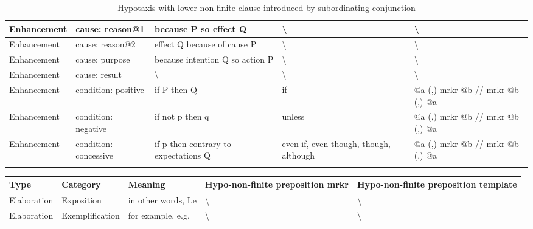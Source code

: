 \begin{landscape}
\begin{longtable}{|l|l|p{3cm}|p{5cm}|p{5cm}|}
			Enhancement & cause: reason@1        & because P so effect Q                & \textbackslash                         & \textbackslash                             \\ \hline
			Enhancement & cause: reason@2        & effect Q because of cause P          & \textbackslash                         & \textbackslash                             \\ \hline
			Enhancement & cause: purpose         & because intention Q so action P      & \textbackslash                         & \textbackslash                             \\ \hline
			Enhancement & cause: result          & \textbackslash                       & \textbackslash                         & \textbackslash                             \\ \hline
			Enhancement & condition: positive    & if P then Q                          & if                                     & @a (,) mrkr @b // mrkr @b (,) @a           \\ \hline
			Enhancement & condition: negative    & if not p then q                      & unless                                 & @a (,) mrkr @b // mrkr @b (,) @a           \\ \hline
			Enhancement & condition: concessive  & if p then contrary to expectations Q & even if, even though, though, although & @a (,) mrkr @b // mrkr @b (,) @a           \\ \hline
			\caption{Hypotaxis with lower non finite clause introduced by subordinating conjunction}
			\label{tab:hypotaxis-non-finite-conjunction}
		\end{longtable}
		\begin{longtable}{|l|l|p{3cm}|p{5cm}|p{5cm}|}
			\hline
			{\bf Type}  & {\bf Category}         & {\bf Meaning}                        & {\bf Hypo-non-finite preposition mrkr}                                    & {\bf Hypo-non-finite preposition template} \\ \hline
			Elaboration & Exposition             & in other words, I.e                  & \textbackslash                                                            & \textbackslash                             \\ \hline
			Elaboration & Exemplification        & for example, e.g.                    & \textbackslash                                                            & \textbackslash                             \\ \hline

\end{longtable}
\end{landscape}
